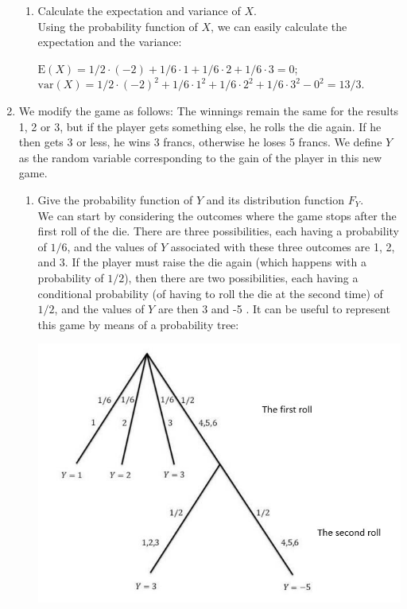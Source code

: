 \documentclass[12pt,thmsa]{article}\usepackage[]{graphicx}\usepackage[]{color}
\begin{document}
\begin{enumerate}
\begin{enumerate}
\item Calculate the expectation and variance of $X$.\\

Using the probability function of $ X $, we can easily calculate the expectation and the variance:

\begin{center}
$\mbox{E}(X) = 1/2\cdot (-2) + 1/6 \cdot 1 + 1/6 \cdot 2+1/6 \cdot 3=0$; \\
$\mbox{var}(X) =  1/2\cdot (-2)^2 + 1/6 \cdot 1^2 + 1/6 \cdot 2^2+1/6 \cdot 3^2-0^2=13/3.$
\end{center}
\end{enumerate}

\item We modify the game as follows: The winnings remain the same for the results 1, 2 or 3, but if the player gets something else, he rolls the die again. If he then gets 3 or less, he wins 3 francs, otherwise he loses 5 francs. We define $Y$ as the random variable corresponding to the gain of the player in this new game.

\begin{enumerate}%
\item Give the probability function of $Y$ and its distribution function $F_Y$.\\

We can start by considering the outcomes where the game stops after the first roll of the die. There are three possibilities, each having a probability of $1/6$, and the values of $ Y $ associated with these three outcomes are 1, 2, and 3. If the player must raise the die again (which happens with a probability of $ 1/2$), then there are two possibilities, each having a conditional probability (of having to roll the die at the second time) of $ 1/2$, and the values of $ Y $ are then 3 and -5 . It can be useful to represent this game by means of a probability tree:

\begin{center}
\includegraphics[scale=0.8]{Arbre_1.jpg}
\end{center}


\end{enumerate}
\end{enumerate}
\end{document}
